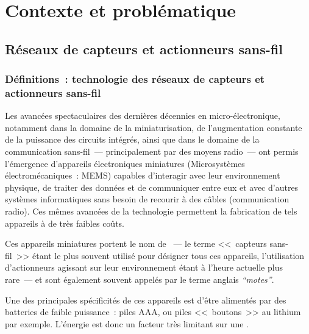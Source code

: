 
\chapter{Contexte et problématique}
\label{ChCtxProb}


\section{Réseaux de capteurs et actionneurs sans-fil}
\label{SecWSN}


\subsection[Définitions]{Définitions~: technologie des réseaux de capteurs
                         et actionneurs sans-fil}
\label{SubsecDefWSN}

Les avancées spectaculaires des dernières décennies en micro-électronique,
notamment dans la domaine de la miniaturisation, de l'augmentation constante
de la puissance des circuits intégrés, ainsi que dans le domaine de la
communication sans-fil~--- principalement par des moyens radio~--- ont permis
l'émergence d'appareils électroniques miniatures (Microsystèmes
électromécaniques~: MEMS) capables d'interagir avec leur environnement
physique, de traiter des données et de communiquer entre eux et avec d'autres
systèmes informatiques sans besoin de recourir à des câbles (communication
radio). Ces mêmes avancées de la technologie permettent la fabrication
de tels appareils à de très faibles coûts.

Ces appareils miniatures portent le nom de ~--- le terme <<~capteurs sans-fil~>> étant le plus souvent
utilisé pour désigner tous ces appareils, l'utilisation d'actionneurs
agissant sur leur environnement étant à l'heure actuelle plus rare~---
et sont également souvent appelés par le terme anglais \emph{``motes''}.

Une des principales spécificités de ces appareils est d'être alimentés
par des batteries de faible puissance~: piles AAA, ou piles <<~boutons~>>
au lithium par exemple. L'énergie est donc un facteur très limitant
sur une .


